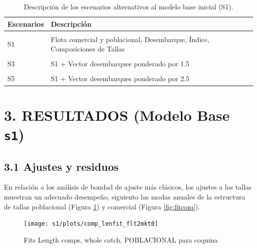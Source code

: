 \documentclass[
]{article}
\begin{document}
\begin{table}[h!]

\caption{\label{tab:unnamed-chunk-9}\label{Tab2}Descripción de los escenarios alternativos al modelo base inicial (S1).}
\centering
\fontsize{10}{12}\selectfont
\begin{tabular}[t]{ll}
\toprule
Escenarios & Descripción\\
\midrule
\cellcolor{gray!6}{S01} & \cellcolor{gray!6}{Solo Desembarque e Índice}\\
S1 & Flota comercial y poblacional, Desembarque, Índice, Composiciones de Tallas\\
\cellcolor{gray!6}{S2} & \cellcolor{gray!6}{S1 + Vector Desembarques desde 1990 asumido en 250 por año}\\
S3 & S1 + Vector desembarques ponderado por 1.5\\
\cellcolor{gray!6}{S4} & \cellcolor{gray!6}{S1 + Vector desembarques ponderado por 2}\\
\addlinespace
S5 & S1 + Vector desembarques ponderado por 2.5\\
\bottomrule
\end{tabular}
\end{table}

\pagebreak

\hypertarget{resultados-modelo-base-s1}{%
\section{\texorpdfstring{3. RESULTADOS (Modelo Base \texttt{s1})}{3. RESULTADOS (Modelo Base s1)}}\label{resultados-modelo-base-s1}}

\hypertarget{ajustes-y-residuos}{%
\subsection{3.1 Ajustes y residuos}\label{ajustes-y-residuos}}

En relación a los análisis de bondad de ajuste más clásicos, los ajustes a las tallas muestran un adecuado desempeño, siguiento las modas anuales de la estructura de tallas poblacional (Figura \ref{fig:fitpob}) y comercial (Figura \ref{fig:fitcom}).

\begin{figure}[H]

{\centering \texttt{[image: s1/plots/comp\_lenfit\_flt2mkt0]} 

}

\caption{\label{fig:fitpob}Fits Length comps, whole catch, POBLACIONAL para coquina}\label{fig:fitpob}
\end{figure}
\end{document}
